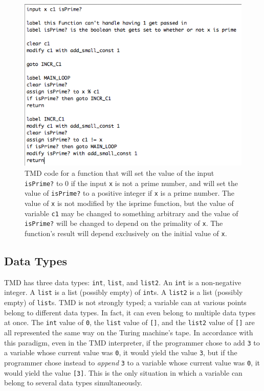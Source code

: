 \documentclass[11pt]{report}
\begin{document}
\begin{figure} 
\begin{center} 
\includegraphics[scale=0.75]{figs/isprime.png} 
\caption{TMD code for a function that will set the value of the input \texttt{isPrime?} to 0 if the input \texttt{x} is not a prime number, and will set the value of \texttt{isPrime?} to a positive integer if \texttt{x} is a prime number. The value of \texttt{x} is not modified by the isprime function, but the value of variable \texttt{c1} may be changed to something arbitrary and the value of \texttt{isPrime?} will be changed to depend on the primality of \texttt{x}. The function's result will depend exclusively on the initial value of \texttt{x}. \label{fig:isprime}} 
\end{center} 
\end{figure}

\subsection{Data Types}

TMD has three data types: \texttt{int}, \texttt{list}, and \texttt{list2}. An \texttt{int} is a non-negative integer. A \texttt{list} is a list (possibly empty) of \texttt{int}s. A \texttt{list2} is a list (possibly empty) of \texttt{list}s. TMD is not strongly typed; a variable can at various points belong to different data types. In fact, it can even belong to multiple data types at once. The \texttt{int} value of \texttt{0}, the \texttt{list} value of \texttt{[]}, and the \texttt{list2} value of \texttt{[]} are all represented the same way on the Turing machine's tape. In accordance with this paradigm, even in the TMD interpreter, if the programmer chose to add \texttt{3} to a variable whose current value was \texttt{0}, it would yield the value \texttt{3}, but if the programmer chose instead to \emph{append} \texttt{3} to a variable whose current value was \texttt{0}, it would yield the value \texttt{[3]}. This is the only situation in which a variable can belong to several data types simultaneously.
\end{document}
